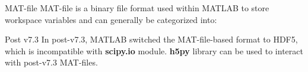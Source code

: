 \documentclass{beamer}
\begin{document}
\begin{frame}[fragile]{MAT-file}
MAT-file is a binary file format used within MATLAB to store workspace variables and can generally be categorized into:
    \begin{block}{Post v7.3}
        In post-v7.3, MATLAB switched the MAT-file-based format to HDF5, which is incompatible with \textbf{scipy.io} module. \textbf{h5py} library can be used to interact with post-v7.3 MAT-files.
    \end{block}
\end{frame}

\end{document}
